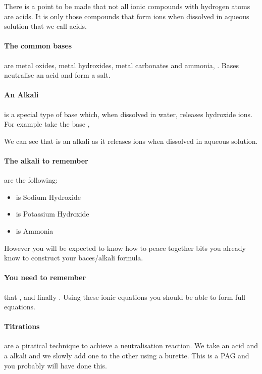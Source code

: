 	There is a point to be made that not all ionic compounds with hydrogen atoms are acids. It is only those compounds that form  ions when dissolved in aqueous solution that we call acids.
	
	\paragraph{The common bases} are metal oxides, metal hydroxides, metal carbonates and ammonia, . Bases neutralise an acid and form a salt.
	
	\paragraph{An Alkali} is a special type of base which, when dissolved in water, releases hydroxide ions. For example take the base ,
	\begin{center}
	\end{center}
	We can see that  is an alkali as it releases  ions when dissolved in aqueous solution.
	
	\paragraph{The alkali to remember} are the following:
	\begin{itemize}
		\item {} is Sodium Hydroxide
		\item {} is Potassium Hydroxide
		\item {} is Ammonia
	\end{itemize}
	However you will be expected to know how to peace together bits you already know to construct your baces/alkali formula.
	
	\paragraph{You need to remember} that ,  and finally . Using these ionic equations you should be able to form full equations.
	
	\paragraph{Titrations} are a piratical technique to achieve a neutralisation reaction. We take an acid and a alkali and we slowly add one to the other using a burette. This is a PAG and you probably will have done this.
	
